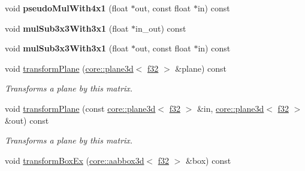 \begin{DoxyCompactItemize}
\item 
void {\bfseries pseudo\+Mul\+With4x1} (float $\ast$out, const float $\ast$in) const \hypertarget{classirr_1_1core_1_1matrix4x3_a1e6e1832923caa0e2a2132601f2791be}{}\label{classirr_1_1core_1_1matrix4x3_a1e6e1832923caa0e2a2132601f2791be}

\item 
void {\bfseries mul\+Sub3x3\+With3x1} (float $\ast$in\+\_\+out) const \hypertarget{classirr_1_1core_1_1matrix4x3_a054e637ea04ebe26f7cd96d30f5cd2e5}{}\label{classirr_1_1core_1_1matrix4x3_a054e637ea04ebe26f7cd96d30f5cd2e5}

\item 
void {\bfseries mul\+Sub3x3\+With3x1} (float $\ast$out, const float $\ast$in) const \hypertarget{classirr_1_1core_1_1matrix4x3_a6f270a5f34ffe9253c48754e98682a41}{}\label{classirr_1_1core_1_1matrix4x3_a6f270a5f34ffe9253c48754e98682a41}

\item 
void \hyperlink{classirr_1_1core_1_1matrix4x3_af8e88f270ab78d75ec4f77689035ac23}{transform\+Plane} (\hyperlink{classirr_1_1core_1_1plane3d}{core\+::plane3d}$<$ \hyperlink{namespaceirr_a0277be98d67dc26ff93b1a6a1d086b07}{f32} $>$ \&plane) const \hypertarget{classirr_1_1core_1_1matrix4x3_af8e88f270ab78d75ec4f77689035ac23}{}\label{classirr_1_1core_1_1matrix4x3_af8e88f270ab78d75ec4f77689035ac23}

\begin{DoxyCompactList}\small\item\em Transforms a plane by this matrix. \end{DoxyCompactList}\item 
void \hyperlink{classirr_1_1core_1_1matrix4x3_a7d99bfa29ef0edd49ce119322c0048f2}{transform\+Plane} (const \hyperlink{classirr_1_1core_1_1plane3d}{core\+::plane3d}$<$ \hyperlink{namespaceirr_a0277be98d67dc26ff93b1a6a1d086b07}{f32} $>$ \&in, \hyperlink{classirr_1_1core_1_1plane3d}{core\+::plane3d}$<$ \hyperlink{namespaceirr_a0277be98d67dc26ff93b1a6a1d086b07}{f32} $>$ \&out) const \hypertarget{classirr_1_1core_1_1matrix4x3_a7d99bfa29ef0edd49ce119322c0048f2}{}\label{classirr_1_1core_1_1matrix4x3_a7d99bfa29ef0edd49ce119322c0048f2}

\begin{DoxyCompactList}\small\item\em Transforms a plane by this matrix. \end{DoxyCompactList}\item 
void \hyperlink{classirr_1_1core_1_1matrix4x3_a1b46e402584287ceadb50af3aec93c19}{transform\+Box\+Ex} (\hyperlink{classirr_1_1core_1_1aabbox3d}{core\+::aabbox3d}$<$ \hyperlink{namespaceirr_a0277be98d67dc26ff93b1a6a1d086b07}{f32} $>$ \&box) const \hypertarget{classirr_1_1core_1_1matrix4x3_a1b46e402584287ceadb50af3aec93c19}{}\label{classirr_1_1core_1_1matrix4x3_a1b46e402584287ceadb50af3aec93c19}


\end{DoxyCompactItemize}
